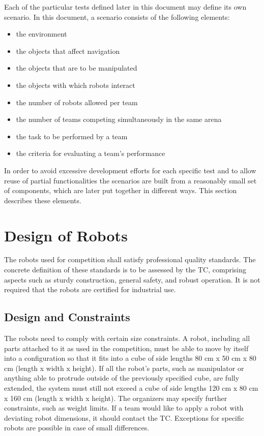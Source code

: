 
Each of the particular tests defined later in this document may define its own scenario. In this document, a scenario consists of the following elements:

\begin{itemize}
	\item the environment
	\item the objects that affect navigation
	\item the objects that are to be manipulated
	\item the objects with which robots interact
	\item the number of robots allowed per team
	\item the number of teams competing simultaneously in the same arena
	\item the task to be performed by a team
	\item the criteria for evaluating a team's performance
\end{itemize}

In order to avoid excessive development efforts for each specific test and to allow reuse of partial functionalities the scenarios are built from a reasonably small set of components, which are later put together in different ways. This section describes these elements.

\section{Design of Robots}
The robots used for competition shall satisfy professional quality standards. The concrete definition of these standards is to be assessed by the TC, comprising aspects such as sturdy construction, general safety, and robust operation. It is not required that the robots are certified for industrial use.

\subsection{Design and Constraints} \label{ssec:RobotDesignAndConstraints}
The robots need to comply with certain size constraints. A robot, including all parts attached to it as used in the competition, must be able to move by itself into a configuration so that it fits into a cube of side lengths 80 cm x 50 cm x 80 cm (length x width x height). If all the robot's parts, such as manipulator or anything able to protrude outside of the previously specified cube, are fully extended, the system must still not exceed a cube of side lengths 120 cm x 80 cm x 160 cm (length x width x height). The organizers may specify further constraints, such as weight limits. If a team would like to apply a robot with deviating robot dimensions, it should contact the TC. Exceptions for specific robots are possible in case of small differences.

